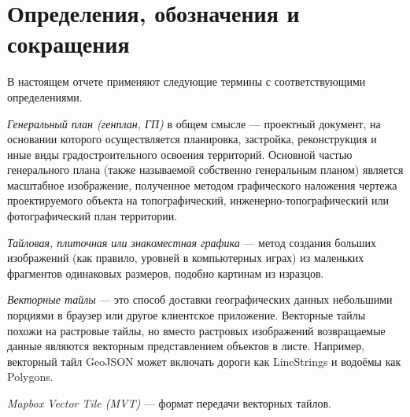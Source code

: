 \section*{\Large{Определения, обозначения и сокращения}}

В настоящем отчете применяют следующие термины с соответствующими определениями.

\textit{Генеральный план (генплан, ГП)} в общем смысле —
проектный документ, на основании которого осуществляется планировка,
застройка, реконструкция и иные виды градостроительного освоения территорий.
Основной частью генерального плана (также называемой собственно генеральным планом)
является масштабное изображение, полученное методом графического наложения чертежа
проектируемого объекта на топографический,
инженерно-топографический или фотографический план территории.

\textit{Тайловая, плиточная или знакоместная графика} — метод создания больших изображений
(как правило, уровней в компьютерных играх) из маленьких фрагментов одинаковых размеров, подобно картинам из изразцов.

\textit{Векторные тайлы} — это способ доставки географических данных небольшими порциями в
браузер или другое клиентское приложение. Векторные тайлы похожи на растровые тайлы,
но вместо растровых изображений возвращаемые данные являются векторным представлением объектов в листе.
Например, векторный тайл GeoJSON может включать дороги как LineStrings и водоёмы как Polygons.

\textit{Mapbox Vector Tile (MVT)} — формат передачи векторных тайлов.
